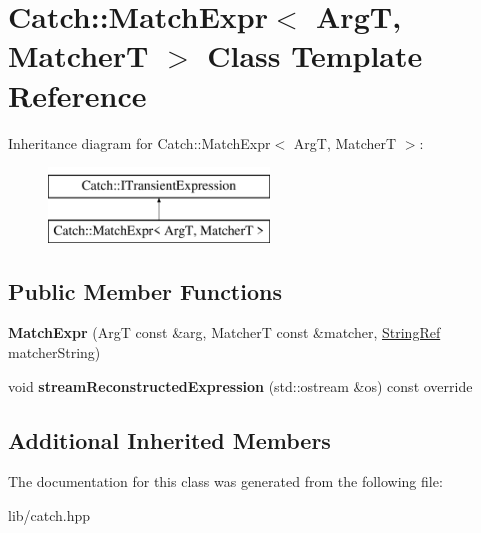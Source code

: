 \hypertarget{class_catch_1_1_match_expr}{}\section{Catch\+:\+:Match\+Expr$<$ ArgT, MatcherT $>$ Class Template Reference}
\label{class_catch_1_1_match_expr}
Inheritance diagram for Catch\+:\+:Match\+Expr$<$ ArgT, MatcherT $>$\+:\begin{figure}[H]
\begin{center}
\leavevmode
\includegraphics[height=2.000000cm]{class_catch_1_1_match_expr}
\end{center}
\end{figure}
\subsection*{Public Member Functions}
\begin{DoxyCompactItemize}
\item 
\mbox{\label{class_catch_1_1_match_expr_ab5b9ecc4fb9e91f5f48756e75affe93d}} 
{\bfseries Match\+Expr} (ArgT const \&arg, MatcherT const \&matcher, \mbox{\hyperlink{class_catch_1_1_string_ref}{String\+Ref}} matcher\+String)
\item 
\mbox{\label{class_catch_1_1_match_expr_ad3e41adb597750b2219bb37e51185629}} 
void {\bfseries stream\+Reconstructed\+Expression} (std\+::ostream \&os) const override
\end{DoxyCompactItemize}
\subsection*{Additional Inherited Members}


The documentation for this class was generated from the following file\+:\begin{DoxyCompactItemize}
\item 
lib/catch.\+hpp\end{DoxyCompactItemize}
